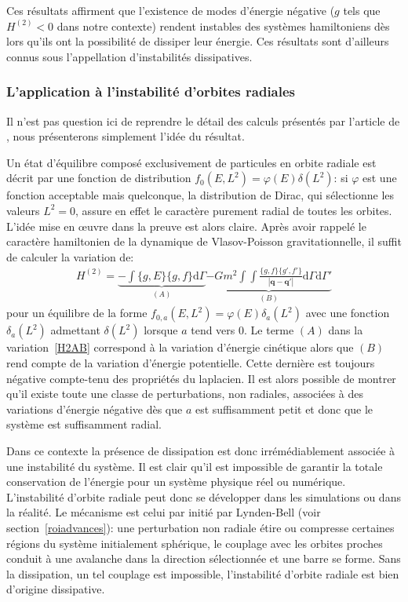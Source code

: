 Ces résultats affirment que l'existence de modes d'énergie négative ($g$ tels que $H^{(2)}<0$ dans notre contexte) rendent instables des systèmes
hamiltoniens dès lors qu'ils ont la possibilité de dissiper leur énergie. Ces résultats sont d'ailleurs connus sous l'appellation \og d'instabilités
dissipatives\fg.



\subsubsection{L'application à l'instabilité d'orbites radiales}

Il n'est pas question ici de reprendre le détail des calculs présentés par l'article de \cite{future}, nous présenterons
simplement l'idée du résultat.

Un état d'équilibre composé exclusivement de particules en orbite radiale est décrit par une fonction de distribution $f_0(E,L^2) = \varphi(E)
\delta(L^2)$: si $\varphi$ est une fonction acceptable mais quelconque, la distribution de Dirac, qui sélectionne les valeurs $L^2=0$,  assure en
effet le caractère purement radial de toutes les orbites. L'idée mise en œuvre dans la preuve est alors claire. Après avoir rappelé le caractère
hamiltonien de la dynamique de Vlasov-Poisson gravitationnelle, il suffit de calculer la variation de:
\begin{align}
	H^{(2)} =
	\underbrace{- \int \{g,E\} \{g,f\} \mathrm{d} \Gamma}_{(A)}
	\underbrace{- G m^2 %
		\int\!\!\!\int \frac{\{g,f\}\{g',f'\}}{|\mathbf{q} - \mathbf{q'}|}
		\mathrm{d} \Gamma \mathrm{d} \Gamma'}_{(B)}
		\label{H2AB}
\end{align}
pour un équilibre de la forme $f_{0,a}(E,L^2) = \varphi(E) \delta_a (L^2)$ avec une fonction $\delta_a (L^2)$ admettant $\delta(L^2)$ lorsque $a$ tend
vers $0$. Le terme $(A)$ dans la variation~\ref{H2AB} correspond à la variation d'énergie cinétique alors que $(B)$ rend compte de la variation
d'énergie potentielle. Cette dernière est toujours négative compte-tenu des propriétés du laplacien. Il est alors possible de montrer qu'il %
existe toute une classe de perturbations, non radiales, associées à des variations d'énergie négative dès que $a$ est suffisamment petit et donc que
le système est suffisamment radial.

Dans ce contexte la présence de dissipation est donc irrémédiablement associée à une instabilité du système. Il est clair qu'il est impossible de
garantir la totale conservation de l'énergie pour un système physique réel ou numérique. L'instabilité d'orbite radiale peut donc se développer dans
les simulations ou dans la réalité. Le mécanisme est celui par initié par Lynden-Bell (voir section~\ref{roiadvances}): une perturbation non
radiale étire ou compresse certaines régions du système initialement sphérique, le couplage avec les orbites proches conduit à une avalanche dans la
direction sélectionnée et une barre se forme. Sans la dissipation, un tel couplage est impossible, l'instabilité d'orbite radiale est bien d'origine
dissipative.


